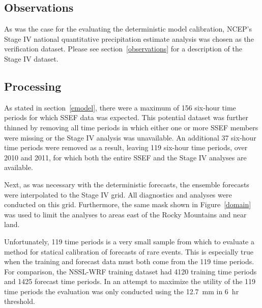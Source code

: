 \subsection{Observations}
\label{eobservations}

As was the case for the evaluating the deterministic model calibration, NCEP's Stage IV national quantitative precipitation estimate analysis was chosen as the verification dataset.
Please see \mbox{section \ref{observations}} for a description of the Stage IV dataset.




\subsection{Processing}
\label{eprocessing}

As stated in \mbox{section \ref{emodel}}, there were a maximum of 156 six-hour time periods for which SSEF data was expected.
This potential dataset was further thinned by removing all time periods in which either one or more SSEF members were missing or the Stage IV analysis was unavailable.
An additional 37 six-hour time periods were removed as a result, leaving 119 six-hour time periods, over 2010 and 2011, for which both the entire SSEF and the Stage IV analyses are available.


Next, as was necessary with the deterministic forecasts, the ensemble forecasts were interpolated to the Stage IV grid.
All diagnostics and analyses were conducted on this grid.
Furthermore, the same mask shown in \mbox{Figure \ref{domain}} was used to limit the analyses to areas east of the Rocky Mountains and near land.


Unfortunately, 119 time periods is a very small sample from which to evaluate a method for statical calibration of forecasts of rare events.
This is especially true when the training and forecast data must both come from the 119 time periods.
For comparison, the NSSL-WRF training dataset had 4120 training time periods and 1425 forecast time periods.
In an attempt to maximize the utility of the 119 time periods the evaluation was only conducted using the \mbox{12.7 mm} in \mbox{6 hr} threshold.


